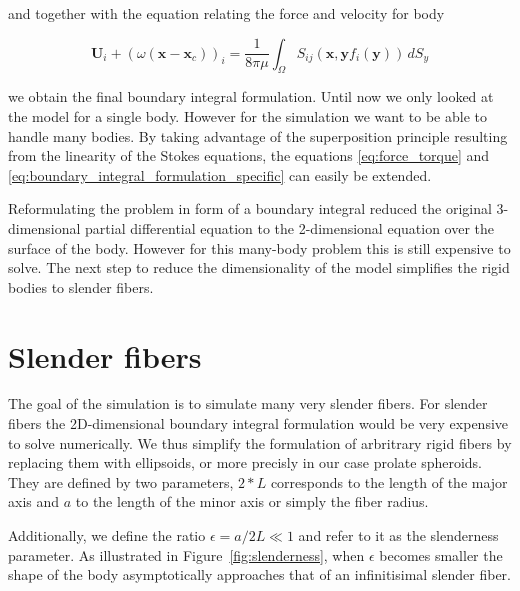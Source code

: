 \documentclass[a4paper,11pt]{kth-mag}
\begin{document}
and together with the equation relating the force and velocity for body

\begin{equation}
  \label{eq:boundary_integral_formulation_specific}
  \mathbf{U}_i + (\omega (\mathbf{x} - \mathbf{x}_c))_i = \frac{1}{8\pi\mu} \int_\Omega S_{ij}(\mathbf{x},\mathbf{y} f_i(\mathbf{y}))  \, dS_y
\end{equation}

we obtain the final boundary integral formulation. Until now we only looked at the model for a single body. However for the simulation we want to be able to handle many bodies. By taking advantage of the superposition principle resulting from the linearity of the Stokes equations, the equations \eqref{eq:force_torque} and \eqref{eq:boundary_integral_formulation_specific} can easily be extended.

Reformulating the problem in form of a boundary integral reduced the original 3-dimensional partial differential equation to the 2-dimensional equation over the surface of the body. However for this many-body problem this is still expensive to solve. The next step to reduce the dimensionality of the model simplifies the rigid bodies to slender fibers.

\section{Slender fibers}

The goal of the simulation is to simulate many very slender fibers. For slender fibers the 2D-dimensional boundary integral formulation would be very expensive to solve numerically. We thus simplify the formulation of arbritrary rigid fibers by replacing them with ellipsoids, or more precisly in our case prolate spheroids. They are defined by two parameters, $2*L$ corresponds to the length of the major axis and $a$ to the length of the minor axis or simply the fiber radius.

Additionally, we define the ratio $\epsilon = a / 2 L \ll 1$ and refer to it as the slenderness parameter. As illustrated in Figure~\ref{fig:slenderness}, when $\epsilon$ becomes smaller the shape of the body asymptotically approaches that of an infinitisimal slender fiber.
\end{document}
